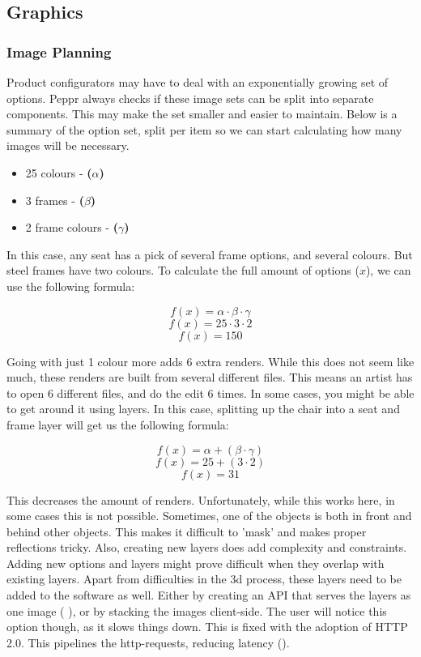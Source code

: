 \subsection{Graphics}

\subsubsection{Image Planning}
Product configurators may have to deal with an exponentially growing set of options. Peppr always checks if these image sets can be split into separate components. This may make the set smaller and easier to maintain. Below is a summary of the option set, split per item so we can start calculating how many images will be necessary.
\begin{itemize}
	\item 25 colours - \textbf{(\( \alpha \))}
	\item 3 frames - \textbf{(\( \beta \))}
	\item 2 frame colours - \textbf{(\( \gamma \))}
\end{itemize}

In this case, any seat has a pick of several frame options, and several colours. But steel frames have two colours. To calculate the full amount of options ($x$), we can use the following formula:
 
\[ f(x) = \alpha \cdot \beta \cdot \gamma\]
\[ f(x) = 25 \cdot 3 \cdot 2\]
\[ f(x) = 150\]

Going with just 1 colour more adds 6 extra renders. While this does not seem like much, these renders are built from several different files. This means an artist has to open 6 different files, and do the edit 6 times.
In some cases, you might be able to get around it using layers. In this case, splitting up the chair into a seat and frame layer will get us the following formula:

\[ f(x) = \alpha + (\beta \cdot \gamma)\]
\[ f(x) = 25 + (3 \cdot 2) \]
\[ f(x) = 31\]

This decreases the amount of renders. Unfortunately, while this works here, in some cases this is not possible. Sometimes, one of the objects is both in front and behind other objects. This makes it difficult to 'mask' and makes proper reflections tricky. Also, creating new layers does add complexity and constraints. Adding new options and layers might prove difficult when they overlap with existing layers.
\newline
Apart from difficulties in the 3d process, these layers need to be added to the software as well. Either by creating an API that serves the layers as one image (\cite{bugaboo} ), or by stacking the images client-side. The user will notice this option though, as it slows things down. This is fixed with the adoption of HTTP 2.0. This pipelines the http-requests, reducing latency (\cite{latency}).

